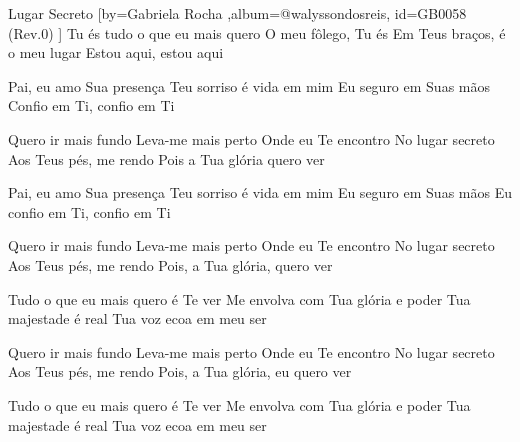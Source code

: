 \beginsong
{Lugar Secreto %
}[by={Gabriela Rocha %
},album={@walyssondosreis},
id={GB0058 %
(Rev.0) %
}]
Tu és tudo o que eu mais quero
O meu fôlego, Tu és
Em Teus braços, é o meu lugar
Estou aqui, estou aqui

Pai, eu amo Sua presença
Teu sorriso é vida em mim
Eu seguro em Suas mãos
Confio em Ti, confio em Ti

Quero ir mais fundo
Leva-me mais perto
Onde eu Te encontro
No lugar secreto
Aos Teus pés, me rendo
Pois a Tua glória quero ver

Pai, eu amo Sua presença
Teu sorriso é vida em mim
Eu seguro em Suas mãos
Eu confio em Ti, confio em Ti

Quero ir mais fundo
Leva-me mais perto
Onde eu Te encontro
No lugar secreto
Aos Teus pés, me rendo
Pois, a Tua glória, quero ver

Tudo o que eu mais quero é Te ver
Me envolva com Tua glória e poder
Tua majestade é real
Tua voz ecoa em meu ser

Quero ir mais fundo
Leva-me mais perto
Onde eu Te encontro
No lugar secreto
Aos Teus pés, me rendo
Pois, a Tua glória, eu quero ver

Tudo o que eu mais quero é Te ver
Me envolva com Tua glória e poder
Tua majestade é real
Tua voz ecoa em meu ser


